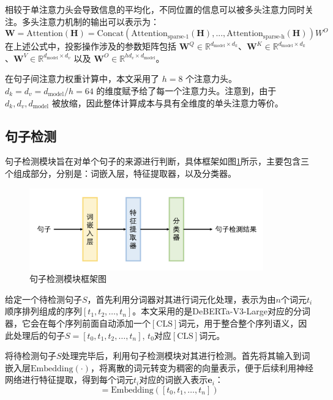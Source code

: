 相较于单注意力头会导致信息的平均化，不同位置的信息可以被多头注意力同时关注。多头注意力机制的输出可以表示为：
\begin{equation}
\textbf{W} = \text{Attention}(\textbf{H}) = \text{Concat} \left(\text{Attention}_\text{sparse-1}(\textbf{H}), ..., \text{Attention}_\text{sparse-h}(\textbf{H}) \right)W^O
\label{eq3.2}
\end{equation}
在上述公式中，投影操作涉及的参数矩阵包括 \(\textbf{W}^Q \in \mathbb{R}^{d_{\text{model}} \times d_k}\)、\(\textbf{W}^K \in \mathbb{R}^{d_{\text{model}} \times d_k}\)、\(\textbf{W}^V \in \mathbb{R}^{d_{\text{model}} \times d_v}\) 以及 \(\textbf{W}^O \in \mathbb{R}^{hd_v \times d_{\text{model}}}\)。

在句子间注意力权重计算中，本文采用了 \(h = 8\) 个注意力头。\(d_k = d_v = d_{\text{model}} / h = 64\) 的维度赋予给了每一个注意力头。注意到，由于 \(d_k, d_v, d_{\text{model}} \) 被放缩，因此整体计算成本与具有全维度的单头注意力等价。

\subsection{句子检测}

句子检测模块旨在对单个句子的来源进行判断，具体框架如图\ref{fig:sentence-classifier}所示，主要包含三个组成部分，分别是：词嵌入层，特征提取器，以及分类器。

\begin{figure}[htbp]
    \centering
    \includegraphics[width=0.9\textwidth]{figures/sentence-classifier.png}
    \caption{句子检测模块框架图}
    \label{fig:sentence-classifier}
\end{figure}

给定一个待检测句子$S$，首先利用分词器对其进行词元化处理，表示为由$n$个词元$t_{i}$顺序排列组成的序列$[t_{1}, t_{2}, \ldots, t_{n}]$。本文采用的是DeBERTa-V3-Large对应的分词器，它会在每个序列前面自动添加一个$[\mathrm{CLS}]$词元，用于整合整个序列语义，因此处理后的句子$S=[t_{0}, t_{1}, t_{2}, \ldots, t_{n}]$, $t_{0}$对应$[\mathrm{CLS}]$词元。

将待检测句子$S$处理完毕后，利用句子检测模块对其进行检测。首先将其输入到词嵌入层$\mathrm{Embedding}(\cdot)$，将离散的词元转变为稠密的向量表示，便于后续利用神经网络进行特征提取，得到每个词元$t_{i}$对应的词嵌入表示$\mathbf{e}_{i}$：
\begin{equation}
    [\mathbf{e}_{0}, \mathbf{e}_{1}, \ldots, \mathbf{e}_{n}]=\mathrm{Embedding}([t_{0}, t_{1}, \ldots, t_{n}])
\end{equation}

